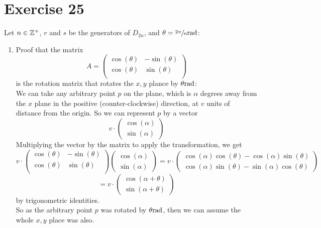 \documentclass[12pt]{article}
\begin{document}
    \section*{Exercise 25}
    Let $n \in \mathbb{Z}^+$, $r$ and $s$ be the generators of $D_{2n}$,
    and $\theta = \sfrac{2 \pi}{n} \text{rad}$: \\
    \begin{enumerate}[label=\textbf{\alph*.}]
        \item 
            Proof that the matrix
            \[ A  = \begin{pmatrix}
                \cos(\theta) & -\sin(\theta) \\
                \cos(\theta) & \sin(\theta) \\
            \end{pmatrix} \]
            is the rotation matrix that rotates the $x, y$ plance
            by $\theta \text{rad}$: \\
            We can take any arbitrary point $p$ on the plane,
            which is $\alpha$ degrees away from the $x$ plane in the positive
            (counter-clockwise) direction,
            at $v$ units of distance from the origin.
            So we can represent $p$ by a vector
            \[v \cdot \begin{pmatrix}
                \cos(\alpha) \\
                \sin(\alpha)
            \end{pmatrix} \]
            Multiplying the vector by the matrix to apply the transformation,
            we get
            \[ v \cdot \begin{pmatrix}
                \cos(\theta) & -\sin(\theta) \\
                \cos(\theta) & \sin(\theta) \\
            \end{pmatrix}
            \begin{pmatrix}
                \cos(\alpha) \\
                \sin(\alpha)
            \end{pmatrix} 
            = v \cdot \begin{pmatrix}
                \cos(\alpha)\cos(\theta) - \cos(\alpha)\sin(\theta) \\
                \cos(\alpha)\sin(\theta) - \sin(\alpha)\cos(\theta)
            \end{pmatrix} \]
            \[ = v \cdot \begin{pmatrix}
                \cos(\alpha + \theta) \\
                \sin(\alpha + \theta)
            \end{pmatrix} \]
            by trigonometric identities. \\
            So as the arbitrary point $p$ was rotated by $\theta \text{rad}$,
            then we can assume the whole $x, y$ place was also.
            

\end{enumerate}
\end{document}

